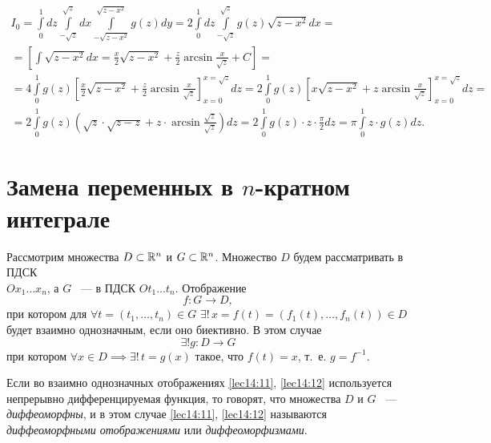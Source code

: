 \documentclass[../../main.tex]{subfiles}
\begin{document}
\begin{example}
		\[
		\begin{gathered}
		I_0 = 
		\int\limits_0^1dz\int\limits_{-\sqrt{z}}^{\sqrt{z}}dx\int\limits_{-\sqrt{z - 
		x^2}}^{\sqrt{z - x^2}}g\left(z\right)dy = 
		2\int\limits_0^1dz\int\limits_{-\sqrt{z}}^{\sqrt{z}}g\left(z\right)\sqrt{z - 
		x^2}dx = \\ =
		\left[\int\sqrt{z - x^2}dx = \frac{x}{2}\sqrt{z - x^2} + 
		\frac{z}{2}\arcsin{\frac{x}{\sqrt{z}}} + C\right] = \\ = 
		4 \int\limits_0^1 g\left(z\right) \left[ \frac{x}{2}\sqrt{z - x^2} + 
		\frac{z}{2}\arcsin{\frac{x}{\sqrt{z}}}\right]_{x=0}^{x=\sqrt{z}}dz= 2 
		\int\limits_0^1 g\left(z\right) \left[x\sqrt{z - x^2} + 
		z\arcsin{\frac{x}{\sqrt{z}}}\right]_{x=0}^{x=\sqrt{z}}dz = \\
		= 2 \int\limits_0^1 g\left(z\right) \left(\sqrt{z} \cdot \sqrt{z-z} + 
		z \cdot \arcsin{\frac{\sqrt{z}}{\sqrt{z}}}\right) dz = 2 \int\limits_0^1 
		g\left(z\right) \cdot z \cdot \frac{\pi}{2} dz = \pi \int\limits_0^1 z \cdot 
		g\left(z\right)dz. 
		\end{gathered}\]
	\end{example}

	\section{Замена переменных в $n$-кратном интеграле}
	
	Рассмотрим множества $D \subset \mathbb{R}^n$ и $G \subset \mathbb{R}^n$. Множество $D$ будем 
	рассматривать в ПДСК\\ $Ox_1 \ldots x_n$, а $G$ ~--- в ПДСК $Ot_1 \ldots t_n$.
	Отображение 
	\begin{equation}
	\label{lec14:11}
	f : G \to D,
	\end{equation} при котором 
	для $\forall t = \left( t_1, \ldots, t_n \right) \in G$ $\exists ! \,
	x = f\left(t\right) = \left(f_1\left( t\right) , \ldots, f_n\left( t\right)  
	\right)  \in D$
	будет взаимно однозначным, если оно биективно. В этом случае 
	\begin{equation}
	\label{lec14:12}
	\exists ! g :  D \to G
	\end{equation}
	при котором $\forall x \in D \implies  \exists!\, t = g\left( x\right) $ 
	такое, что 
	$f\left( t\right)  = x$, т.~е. $g = f^{-1}$.
	
	Если во взаимно однозначных отображениях \eqref{lec14:11}, \eqref{lec14:12}
	используется непрерывно дифференцируемая функция, то говорят, что множества 
	$D$ и $G$ ~--- \emph{диффеоморфны}, и в этом случае 
	\eqref{lec14:11}, \eqref{lec14:12} называются \emph{диффеоморфными 
	отображениями}
	или \emph{диффеоморфизмами}.
	
\end{document}
